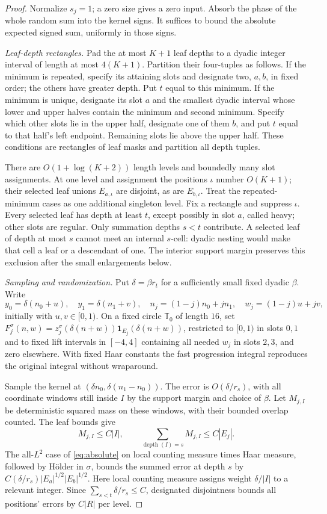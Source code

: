 \documentclass[11pt]{article}
\theoremstyle{definition}
\newcommand{\T}{\mathbb T}
\newcommand{\one}{\mathbf 1}
\numberwithin{equation}{section}
\begin{document}
\begin{proof}
Normalize $s_j=1$; a zero size gives a zero input. Absorb the phase of the whole random sum into the kernel signs. It suffices to bound the absolute expected signed sum, uniformly in those signs.

\emph{Leaf-depth rectangles.} Pad the at most $K+1$ leaf depths to a dyadic integer interval of length at most $4(K+1)$. Partition their four-tuples as follows. If the minimum is repeated, specify its attaining slots and designate two, $a,b$, in fixed order; the others have greater depth. Put $t$ equal to this minimum. If the minimum is unique, designate its slot $a$ and the smallest dyadic interval whose lower and upper halves contain the minimum and second minimum. Specify which other slots lie in the upper half, designate one of them $b$, and put $t$ equal to that half's left endpoint. Remaining slots lie above the upper half. These conditions are rectangles of leaf masks and partition all depth tuples.

There are $O(1+\log(K+2))$ length levels and boundedly many slot assignments. At one level and assignment the positions $\iota$ number $O(K+1)$; their selected leaf unions $E_{a,\iota}$ are disjoint, as are $E_{b,\iota}$. Treat the repeated-minimum cases as one additional singleton level. Fix a rectangle and suppress $\iota$. Every selected leaf has depth at least $t$, except possibly in slot $a$, called heavy; other slots are regular. Only summation depths $s<t$ contribute. A selected leaf of depth at most $s$ cannot meet an internal $s$-cell: dyadic nesting would make that cell a leaf or a descendant of one. The interior support margin preserves this exclusion after the small enlargements below.

\emph{Sampling and randomization.} Put $\delta=\beta r_t$ for a sufficiently small fixed dyadic $\beta$. Write
\[
 y_0=\delta(n_0+u),\quad y_1=\delta(n_1+v),\quad
 n_j=(1-j)n_0+jn_1,\quad w_j=(1-j)u+jv,
\]
initially with $u,v\in[0,1)$. On a fixed circle $\T_0$ of length $16$, set $F_j^\sigma(n,w)=z_j^\sigma(\delta(n+w))\one_{E_j}(\delta(n+w))$, restricted to $[0,1)$ in slots $0,1$ and to fixed lift intervals in $[-4,4]$ containing all needed $w_j$ in slots $2,3$, and zero elsewhere. With fixed Haar constants the fast progression integral reproduces the original integral without wraparound.

Sample the kernel at $(\delta n_0,\delta(n_1-n_0))$. The error is $O(\delta/r_s)$, with all coordinate windows still inside $I$ by the support margin and choice of $\beta$. Let $M_{j,I}$ be deterministic squared mass on these windows, with their bounded overlap counted. The leaf bounds give
\[
 M_{j,I}\le C|I|,\qquad
 \sum_{\operatorname{depth}(I)=s}M_{j,I}\le C|E_j|.
\]
The all-$L^2$ case of \eqref{eq:absolute} on local counting measure times Haar measure, followed by H\"older in $\sigma$, bounds the summed error at depth $s$ by $C(\delta/r_s)|E_a|^{1/2}|E_b|^{1/2}$. Here local counting measure assigns weight $\delta/|I|$ to a relevant integer. Since $\sum_{s<t}\delta/r_s\le C$, designated disjointness bounds all positions' errors by $C|R|$ per level.


\end{proof}
\end{document}
